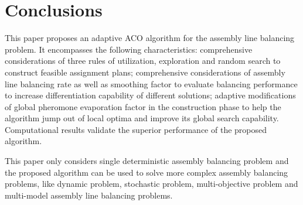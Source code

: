 \section{Conclusions}
This paper proposes an adaptive ACO algorithm for the assembly line balancing problem.
It encompasses the following characteristics: comprehensive considerations of three rules of utilization, exploration and random search to construct feasible assignment plans; comprehensive considerations of assembly line balancing rate as well as smoothing factor to evaluate balancing performance to increase differentiation capability of different solutions; adaptive modifications of global pheromone evaporation factor in the construction phase to help the algorithm jump out of local optima and improve its global search capability. 
Computational results validate the superior performance of the proposed algorithm.

This paper only considers single deterministic assembly balancing problem and the proposed algorithm can be used to solve more complex assembly balancing problems, like dynamic problem, stochastic problem, multi-objective problem and multi-model assembly line balancing problems.
